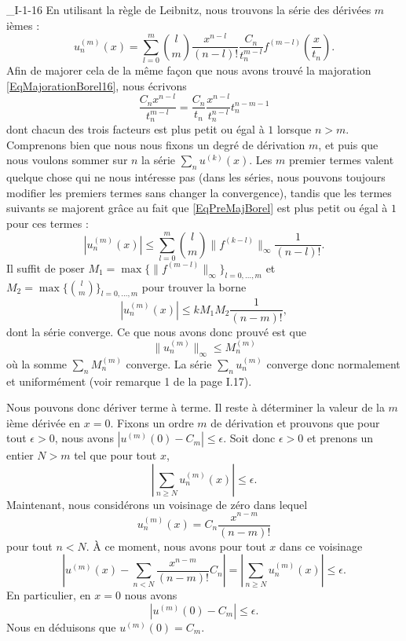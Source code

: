 \begin{corrige}{_I-1-16}
En utilisant la règle de Leibnitz, nous trouvons la série des dérivées $m$ièmes :
\begin{equation}
	u_n^{(m)}(x)=\sum_{l=0}^m {l\choose m} \frac{ x^{n-l} }{ (n-l)! }\frac{ C_n }{ t_n^{m-l} }f^{(m-l)}(\frac{ x }{ t_n }).
\end{equation}
Afin de majorer cela de la même façon que nous avons trouvé la majoration \eqref{EqMajorationBorel16}, nous écrivons
\begin{equation}		\label{EqPreMajBorel}
	\frac{ C_nx^{n-l} }{ t_n^{m-l} }=\frac{ C_n }{ t_n }\frac{ x^{n-l} }{ t_n^{n-l} }t_n^{n-m-1}
\end{equation}
dont chacun des trois facteurs est plus petit ou égal à $1$ lorsque $n>m$. Comprenons bien que nous nous fixons un degré de dérivation $m$, et puis que nous voulons sommer sur $n$ la série $\sum_n u^{(k)}(x)$. Les $m$ premier termes valent quelque chose qui ne nous intéresse pas (dans les séries, nous pouvons toujours modifier les premiers termes sans changer la convergence), tandis que les termes suivants se majorent grâce au fait que \eqref{EqPreMajBorel} est plus petit ou égal à $1$ pour ces termes :
\begin{equation}
	| u_n^{(m)}(x) |\leq \sum_{l=0}^m{l\choose m} \| f^{(k-l)} \|_{\infty}\frac{1}{ (n-l)! }.
\end{equation}
Il suffit de poser $M_1=\max\{ \| f^{(m-l)} \|_{\infty} \}_{l=0,\ldots,m}$ et $M_2=\max\{ {l\choose m} \}_{l=0,\ldots,m}$ pour trouver la borne
\begin{equation}
	| u_n^{(m)}(x) |\leq kM_1M_2\frac{1}{ (n-m)! }, 
\end{equation}
dont la série converge. Ce que nous avons donc prouvé est que
\begin{equation}
	\| u_n^{(m)} \|_{\infty}\leq M_n^{(m)}
\end{equation}
où la somme $\sum_nM_n^{(m)}$ converge. La série $\sum_nu_n^{(m)}$ converge donc normalement et uniformément (voir remarque 1 de la page I.17).

Nous pouvons donc dériver terme à terme. Il reste à déterminer la valeur de la $m$ième dérivée en $x=0$. Fixons un ordre $m$ de dérivation et prouvons que pour tout $\epsilon>0$, nous avons $| u^{(m)}(0)-C_m |\leq \epsilon$. Soit donc $\epsilon>0$ et prenons un entier $N>m$ tel que pour tout $x$,
\begin{equation}
	\left| \sum_{n\geq N}u_n^{(m)}(x) \right| \leq \epsilon.
\end{equation}
Maintenant, nous considérons un voisinage de zéro dans lequel
\begin{equation}
	u_n^{(m)}(x)=C_n\frac{ x^{n-m} }{ (n-m)! }
\end{equation}
pour tout $n<N$. À ce moment, nous avons pour tout $x$ dans ce voisinage
\begin{equation}
	\left| u^{(m)}(x)-\sum_{n<N}\frac{ x^{n-m} }{ (n-m)! }C_n \right| =\left| \sum_{n\geq N}u_n^{(m)}(x) \right| \leq\epsilon.
\end{equation}
En particulier, en $x=0$ nous avons
\begin{equation}
	| u^{(m)}(0)-C_m |\leq\epsilon.
\end{equation}
Nous en déduisons que $u^{(m)}(0)=C_m$.



\end{corrige}

